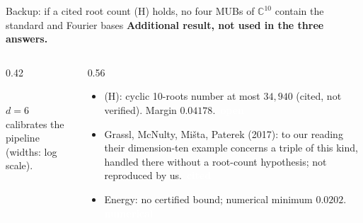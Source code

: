 \documentclass[aspectratio=169,11pt,t]{beamer}
\newcommand{\tg}[2]{{\setlength{\fboxsep}{1.2pt}\colorbox{#1}{\textcolor{white}{\sffamily\bfseries\footnotesize\,#2\,}}}}
\newcommand{\Tnum}{\tg{cNum}{numerical}}
\newcommand{\Tcited}{\tg{cCited}{cited}}
\newcommand{\Tcond}{\tg{cOpen}{open}}
\newcommand{\C}{\mathbb{C}}
\newcommand{\addbanner}{{\color{hl}\bfseries\small Additional result, not used in the three answers.}\par\vspace{0.12cm}}
\begin{document}
\begin{frame}{Backup: if a cited root count (H) holds, no four MUBs of $\C^{10}$ contain the standard and Fourier bases}
\addbanner
\small
\begin{columns}[T]
\begin{column}{0.42\textwidth}
\centering
{}\\[1pt]
\footnotesize $d=6$ calibrates the pipeline (widths: log scale).
\end{column}
\begin{column}{0.56\textwidth}
\begin{itemize}\small\setlength\itemsep{3pt}
\item (H): cyclic 10-roots number at most $34{,}940$ (cited, not verified). Margin $0.04178$. \Tcond
\item Grassl, McNulty, Mi\v{s}ta, Paterek (2017): to our reading their dimension-ten example concerns a triple of this kind, handled there without a root-count hypothesis; not reproduced by us. \Tcited
\item Energy: no certified bound; numerical minimum $0.0202$. \Tnum
\end{itemize}
\end{column}
\end{columns}
\end{frame}
\end{document}
